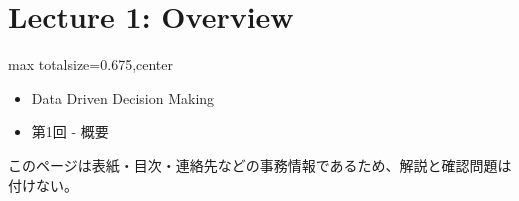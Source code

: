 \section*{Lecture 1: Overview}
\clearpage
{}
\begin{adjustbox}{max totalsize={\textwidth}{0.675\textheight},center}
\begin{minipage}{\textwidth}\scriptsize
\begin{minipage}[t]{0.485\textwidth}
\begin{itemize}
\item Data Driven Decision Making
\item 第1回 - 概要
\end{itemize}
\end{minipage}\hfill
\begin{minipage}[t]{0.485\textwidth}
{\small このページは表紙・目次・連絡先などの事務情報であるため、解説と確認問題は付けない。}
\end{minipage}
\end{minipage}
\end{adjustbox}

